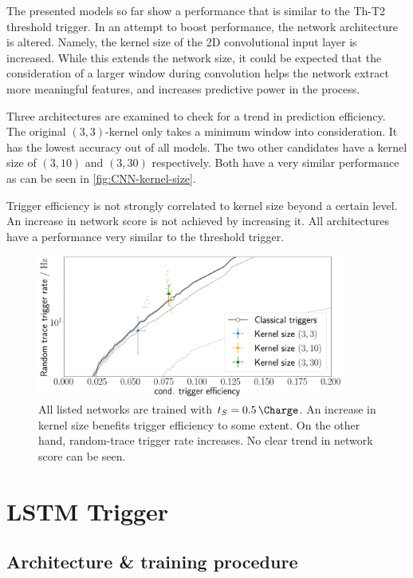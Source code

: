 The presented models so far show a performance that is similar to the Th-T2 threshold trigger. In an attempt to boost performance, the network architecture is 
altered. Namely, the kernel size of the 2D convolutional input layer is increased. While this extends the network size, it could be expected that the 
consideration of a larger window during convolution helps the network extract more meaningful features, and increases predictive power in the process.

Three architectures are examined to check for a trend in prediction efficiency. The original $(3, 3)$-kernel only takes a minimum window into consideration. 
It has the lowest accuracy out of all models. The two other candidates have a kernel size of $(3, 10)$ and $(3, 30)$ respectively. Both have a very similar 
performance as can be seen in \autoref{fig:CNN-kernel-size}. 

Trigger efficiency is not strongly correlated to kernel size beyond a certain level. An increase in network score is not achieved by increasing it. All 
architectures have a performance very similar to the threshold trigger.

\begin{figure}
	\centering
	\includegraphics[width=0.9\textwidth]{./plots/CNN_kernel_size.png}
	\caption{All listed networks are trained with $t_S = \SI{0.5}{\Charge}$. An increase in kernel size benefits trigger efficiency to some extent. On the other
	hand, random-trace trigger rate increases. No clear trend in network score can be seen.}
	\label{fig:CNN-kernel-size}
\end{figure}

\section{LSTM Trigger}
\label{sec:lstm-performance}

\subsection{Architecture \& training procedure}
\label{ssec:lstm-architecture}

